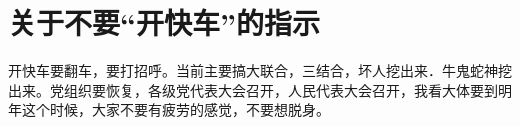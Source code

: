 \section[关于不要“开快车”的指示（一九六七年七月十三日）]{关于不要“开快车”的指示}


开快车要翻车，要打招呼。当前主要搞大联合，三结合，坏人挖出来．牛鬼蛇神挖出来。党组织要恢复，各级党代表大会召开，人民代表大会召开，我看大体要到明年这个时候，大家不要有疲劳的感觉，不要想脱身。

